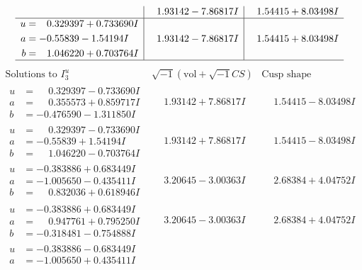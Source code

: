\documentclass[1p]{elsarticle_modified}
\theoremstyle{definition}
\newcommand{\I}{\sqrt{-1}}
\begin{document}
$$\begin{array}{c|c|c}
 & \phantom{-}1.93142 - 7.86817 I & \phantom{-}1.54415 + 8.03498 I \\ \hline\begin{aligned}
u &= \phantom{-}0.329397 + 0.733690 I \\
a &= -0.55839 - 1.54194 I \\
b &= \phantom{-}1.046220 + 0.703764 I\end{aligned}
 & \phantom{-}1.93142 - 7.86817 I & \phantom{-}1.54415 + 8.03498 I\\
 \hline 
 \end{array}$$\newpage$$\begin{array}{c|c|c}  
\text{Solutions to }I^u_{3}& \I (\text{vol} + \sqrt{-1}CS) & \text{Cusp shape}\\
 \hline 
\begin{aligned}
u &= \phantom{-}0.329397 - 0.733690 I \\
a &= \phantom{-}0.355573 + 0.859717 I \\
b &= -0.476590 - 1.311850 I\end{aligned}
 & \phantom{-}1.93142 + 7.86817 I & \phantom{-}1.54415 - 8.03498 I \\ \hline\begin{aligned}
u &= \phantom{-}0.329397 - 0.733690 I \\
a &= -0.55839 + 1.54194 I \\
b &= \phantom{-}1.046220 - 0.703764 I\end{aligned}
 & \phantom{-}1.93142 + 7.86817 I & \phantom{-}1.54415 - 8.03498 I \\ \hline\begin{aligned}
u &= -0.383886 + 0.683449 I \\
a &= -1.005650 - 0.435411 I \\
b &= \phantom{-}0.832036 + 0.618946 I\end{aligned}
 & \phantom{-}3.20645 - 3.00363 I & \phantom{-}2.68384 + 4.04752 I \\ \hline\begin{aligned}
u &= -0.383886 + 0.683449 I \\
a &= \phantom{-}0.947761 + 0.795250 I \\
b &= -0.318481 - 0.754888 I\end{aligned}
 & \phantom{-}3.20645 - 3.00363 I & \phantom{-}2.68384 + 4.04752 I \\ \hline\begin{aligned}
u &= -0.383886 - 0.683449 I \\
a &= -1.005650 + 0.435411 I \\

\end{aligned}
\end{array}$$
\end{document}
